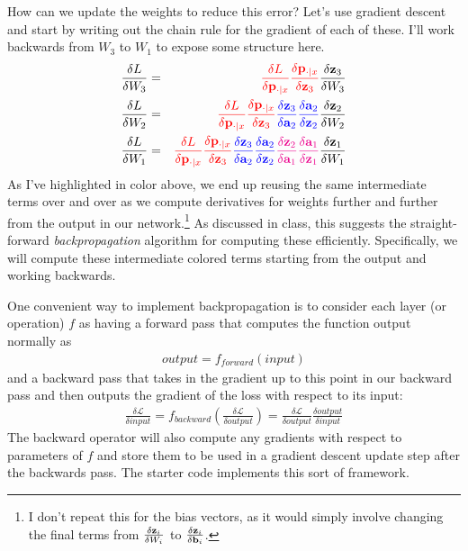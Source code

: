 \documentclass[a4paper,10pt]{article}
\begin{document}
How can we update the weights to reduce this error? Let's use gradient descent and start by writing out the chain rule for the gradient of each of these. I'll work backwards from $W_3$ to $W_1$ to expose some structure here.
%
\begin{eqnarray}
\frac{\delta L}{\delta W_3} &=& \textcolor{red}{\frac{\delta L}{\delta \mathbf{p}_{\cdot|x}}\frac{\delta \mathbf{p}_{\cdot|x}}{\delta \mathbf{z}_3}}\frac{\delta \mathbf{z}_3}{\delta W_3}\\
\frac{\delta L}{\delta W_2} &=& \textcolor{red}{\frac{\delta L}{\delta \mathbf{p}_{\cdot|x}}\frac{\delta \mathbf{p}_{\cdot|x}}{\delta \mathbf{z}_3}}\textcolor{blue}{\frac{\delta \mathbf{z}_3}{\delta \mathbf{a}_2}\frac{\delta \mathbf{a}_2}{\delta \mathbf{z}_2}}\frac{\delta \mathbf{z}_2}{\delta W_2}\\
\frac{\delta L}{\delta W_1} &=& \textcolor{red}{\frac{\delta L}{\delta \mathbf{p}_{\cdot|x}}\frac{\delta \mathbf{p}_{\cdot|x}}{\delta \mathbf{z}_3}}\textcolor{blue}{\frac{\delta \mathbf{z}_3}{\delta \mathbf{a}_2}\frac{\delta \mathbf{a}_2}{\delta \mathbf{z}_2}}\textcolor{magenta}{\frac{\delta \mathbf{z}_2}{\delta \mathbf{a}_1}\frac{\delta \mathbf{a}_1}{\delta \mathbf{z}_1}}\frac{\delta \mathbf{z}_1}{\delta W_1}
\end{eqnarray}
%
As I've highlighted in color above, we end up reusing the same intermediate terms over and over as we compute derivatives for weights further and further from the output in our network.\footnote{\noindent I don't repeat this for the bias vectors, as it would simply involve changing the final terms from $\frac{\delta \mathbf{z}_i}{\delta W_i}$ to $\frac{\delta \mathbf{z}_i}{\delta \mathbf{b}_i}$. } As discussed in class, this suggests the straight-forward \emph{backpropagation} algorithm for computing these efficiently. Specifically, we will compute these intermediate colored terms starting from the output and working backwards. 


 One convenient way to implement backpropagation is to consider each layer (or operation) $f$ as having a forward pass that computes the function output normally as
\begin{eqnarray}
output = f_{forward}(input)
\end{eqnarray}
and a backward pass that takes in the gradient up to this point in our backward pass and then outputs the gradient of the loss with respect to its input:
%
\begin{eqnarray}
\frac{\delta \mathcal{L}}{\delta input} = f_{backward}\left(\frac{\delta \mathcal{L}}{\delta output}\right) = \frac{\delta \mathcal{L}}{\delta output}\frac{\delta output}{\delta input}
\end{eqnarray}
%
The backward operator will also compute any gradients with respect to parameters of $f$ and store them to be used in a gradient descent update step after the backwards pass. The starter code implements this sort of framework.
\end{document}
